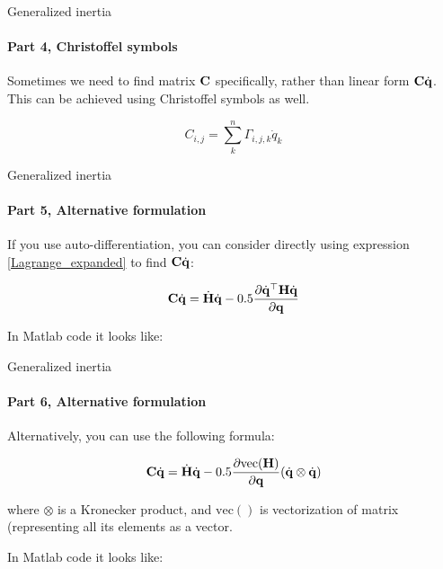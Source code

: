 \documentclass{beamer}
\begin{document}
\begin{frame}{Generalized inertia}
	\framesubtitle{Part 4, Christoffel symbols}
	\begin{flushleft}
		
		Sometimes we need to find matrix $\mathbf{C}$ specifically, rather than linear form $\mathbf{C}\dot{\mathbf{q}}$. This can be achieved using Christoffel symbols as well.
		
		\begin{equation}
			C_{i, j} = 
			\sum\limits_{k}^{n} \Gamma_{i,j,k} \dot{q}_k
		\end{equation}
		
	\end{flushleft}
\end{frame}




\begin{frame}{Generalized inertia}
	\framesubtitle{Part 5, Alternative formulation}
	\begin{flushleft}
		
		If you use auto-differentiation, you can consider directly using expression \eqref{Lagrange_expanded} to find $\mathbf{C}\dot{\mathbf{q}}$:
		
		\begin{equation}
			\mathbf{C}\dot{\mathbf{q}} = 
			\dot{\mathbf{H}} \dot{\mathbf{q}} - 
			0.5 \frac{\partial  \dot{\mathbf{q}}^\top \mathbf{H} \dot{\mathbf{q}}}
			{\partial \mathbf{q}} 
		\end{equation}
		
		In Matlab code it looks like:
		
		
		
	\end{flushleft}
\end{frame}



\begin{frame}{Generalized inertia}
	\framesubtitle{Part 6, Alternative formulation}
	\begin{flushleft}
		
		Alternatively, you can use the following formula:
		
		\begin{equation}
			\mathbf{C}\dot{\mathbf{q}} = 
			\dot{\mathbf{H}} \dot{\mathbf{q}} - 
			0.5 \frac{\partial \text{vec}( \mathbf{H} ) }
			{\partial \mathbf{q}} (\dot{\mathbf{q}} \otimes \dot{\mathbf{q}}) 
		\end{equation}
		
		where $\otimes$ is a Kronecker product, and $\text{vec}()$ is vectorization of matrix (representing all its elements as a vector. 
		
		\bigskip
		
		In Matlab code it looks like:
		
		
		
	\end{flushleft}
\end{frame}
\end{document}
